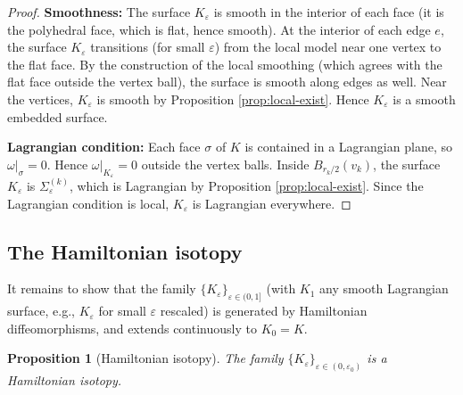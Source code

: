\documentclass[12pt]{article}
\newtheorem{proposition}[theorem]{Proposition}
\newcommand{\eps}{\varepsilon}
\newcommand{\om}{\omega}
\begin{document}
\begin{proof}
\textbf{Smoothness:} The surface $K_\eps$ is smooth in the interior of each face (it is the polyhedral face, which is flat, hence smooth). At the interior of each edge $e$, the surface $K_\eps$ transitions (for small $\eps$) from the local model near one vertex to the flat face. By the construction of the local smoothing (which agrees with the flat face outside the vertex ball), the surface is smooth along edges as well. Near the vertices, $K_\eps$ is smooth by Proposition \ref{prop:local-exist}. Hence $K_\eps$ is a smooth embedded surface.

\textbf{Lagrangian condition:} Each face $\sigma$ of $K$ is contained in a Lagrangian plane, so $\om|_\sigma = 0$. Hence $\om|_{K_\eps} = 0$ outside the vertex balls. Inside $B_{r_k/2}(v_k)$, the surface $K_\eps$ is $\Sigma_\eps^{(k)}$, which is Lagrangian by Proposition \ref{prop:local-exist}. Since the Lagrangian condition is local, $K_\eps$ is Lagrangian everywhere.
\end{proof}

\subsection{The Hamiltonian isotopy}

It remains to show that the family $\{K_\eps\}_{\eps \in (0,1]}$ (with $K_1$ any smooth Lagrangian surface, e.g., $K_\eps$ for small $\eps$ rescaled) is generated by Hamiltonian diffeomorphisms, and extends continuously to $K_0 = K$.

\begin{proposition}[Hamiltonian isotopy]
\label{prop:hamiltonian-isotopy}
The family $\{K_\eps\}_{\eps \in (0,\eps_0)}$ is a Hamiltonian isotopy.
\end{proposition}
\end{document}

